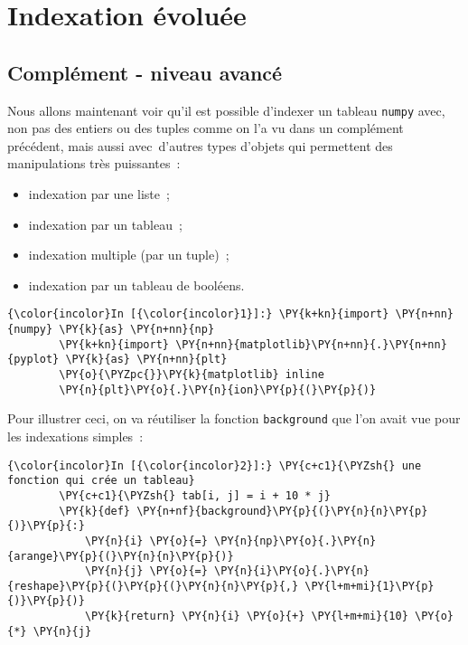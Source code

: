     
    
    
    

    

    \hypertarget{indexation-uxe9voluuxe9e}{%
\section{Indexation évoluée}\label{indexation-uxe9voluuxe9e}}

    \hypertarget{compluxe9ment---niveau-avancuxe9}{%
\subsection{Complément - niveau
avancé}\label{compluxe9ment---niveau-avancuxe9}}

    Nous allons maintenant voir qu'il est possible d'indexer un tableau
\texttt{numpy} avec, non pas des entiers ou des tuples comme on l'a vu
dans un complément précédent, mais aussi avec~d'autres types d'objets
qui permettent des manipulations très puissantes~:

\begin{itemize}
\tightlist
\item
  indexation par une liste~;
\item
  indexation par un tableau~;
\item
  indexation multiple (par un tuple)~;
\item
  indexation par un tableau de booléens.
\end{itemize}

    \begin{Verbatim}[commandchars=\\\{\},frame=single,framerule=0.3mm,rulecolor=\color{cellframecolor}]
{\color{incolor}In [{\color{incolor}1}]:} \PY{k+kn}{import} \PY{n+nn}{numpy} \PY{k}{as} \PY{n+nn}{np}
        \PY{k+kn}{import} \PY{n+nn}{matplotlib}\PY{n+nn}{.}\PY{n+nn}{pyplot} \PY{k}{as} \PY{n+nn}{plt}
        \PY{o}{\PYZpc{}}\PY{k}{matplotlib} inline
        \PY{n}{plt}\PY{o}{.}\PY{n}{ion}\PY{p}{(}\PY{p}{)}
\end{Verbatim}


    Pour illustrer ceci, on va réutiliser la fonction \texttt{background}
que l'on avait vue pour les indexations simples~:

    \begin{Verbatim}[commandchars=\\\{\},frame=single,framerule=0.3mm,rulecolor=\color{cellframecolor}]
{\color{incolor}In [{\color{incolor}2}]:} \PY{c+c1}{\PYZsh{} une fonction qui crée un tableau}
        \PY{c+c1}{\PYZsh{} tab[i, j] = i + 10 * j}
        \PY{k}{def} \PY{n+nf}{background}\PY{p}{(}\PY{n}{n}\PY{p}{)}\PY{p}{:}
            \PY{n}{i} \PY{o}{=} \PY{n}{np}\PY{o}{.}\PY{n}{arange}\PY{p}{(}\PY{n}{n}\PY{p}{)}
            \PY{n}{j} \PY{o}{=} \PY{n}{i}\PY{o}{.}\PY{n}{reshape}\PY{p}{(}\PY{p}{(}\PY{n}{n}\PY{p}{,} \PY{l+m+mi}{1}\PY{p}{)}\PY{p}{)}
            \PY{k}{return} \PY{n}{i} \PY{o}{+} \PY{l+m+mi}{10} \PY{o}{*} \PY{n}{j}
\end{Verbatim}


